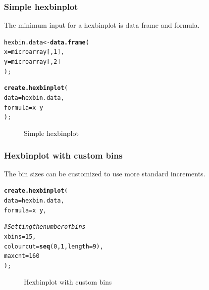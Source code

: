 \documentclass[letterpaper]{article}\usepackage[]{graphicx}\usepackage[]{color}
\makeatletter
\newcommand{\hlnum}[1]{\textcolor[rgb]{0.686,0.059,0.569}{#1}}%
\newcommand{\hlcom}[1]{\textcolor[rgb]{0.678,0.584,0.686}{\textit{#1}}}%
\newcommand{\hlopt}[1]{\textcolor[rgb]{0,0,0}{#1}}%
\newcommand{\hlstd}[1]{\textcolor[rgb]{0.345,0.345,0.345}{#1}}%
\newcommand{\hlkwb}[1]{\textcolor[rgb]{0.69,0.353,0.396}{#1}}%
\newcommand{\hlkwc}[1]{\textcolor[rgb]{0.333,0.667,0.333}{#1}}%
\newcommand{\hlkwd}[1]{\textcolor[rgb]{0.737,0.353,0.396}{\textbf{#1}}}%
\newenvironment{kframe}{%
 \def\at@end@of@kframe{}%
 \ifinner\ifhmode%
  \def\at@end@of@kframe{\end{minipage}}%
  \begin{minipage}{\columnwidth}%
 \fi\fi%
 \def\FrameCommand##1{\hskip\@totalleftmargin \hskip-\fboxsep
 \colorbox{shadecolor}{##1}\hskip-\fboxsep
     \hskip-\linewidth \hskip-\@totalleftmargin \hskip\columnwidth}%
 \MakeFramed {\advance\hsize-\width
   \@totalleftmargin\z@ \linewidth\hsize
   \@setminipage}}%
 {\par\unskip\endMakeFramed%
 \at@end@of@kframe}
\newenvironment{knitrout}{}{} %
\makeatother
\begin{document}
\subsubsection{Simple hexbinplot}
The minimum input for a hexbinplot is data frame and formula.
\begin{knitrout}
\color{fgcolor}\begin{kframe}
\begin{alltt}
\hlstd{hexbin.data} \hlkwb{<-} \hlkwd{data.frame}\hlstd{(}
    \hlkwc{x} \hlstd{= microarray[,}\hlnum{1}\hlstd{],}
    \hlkwc{y} \hlstd{= microarray[,}\hlnum{2}\hlstd{]}
    \hlstd{);}

\hlkwd{create.hexbinplot}\hlstd{(}
    \hlkwc{data} \hlstd{= hexbin.data,}
    \hlkwc{formula} \hlstd{= x} \hlopt{~} \hlstd{y}
    \hlstd{);}
\end{alltt}
\end{kframe}\begin{figure}[]


{\centering {} 

}

\caption[Simple hexbinplot]{Simple hexbinplot\label{fig:hexbin1}}
\end{figure}


\end{knitrout}

\subsubsection{Hexbinplot with custom bins}
The bin sizes can be customized to use more standard increments.
\begin{knitrout}
\color{fgcolor}\begin{kframe}
\begin{alltt}
\hlkwd{create.hexbinplot}\hlstd{(}
    \hlkwc{data} \hlstd{= hexbin.data,}
    \hlkwc{formula} \hlstd{= x} \hlopt{~} \hlstd{y,}

    \hlcom{# Setting the number of bins}
    \hlkwc{xbins} \hlstd{=} \hlnum{15}\hlstd{,}
    \hlkwc{colourcut} \hlstd{=} \hlkwd{seq}\hlstd{(}\hlnum{0}\hlstd{,} \hlnum{1}\hlstd{,} \hlkwc{length} \hlstd{=} \hlnum{9}\hlstd{),}
    \hlkwc{maxcnt} \hlstd{=} \hlnum{160}
    \hlstd{);}
\end{alltt}
\end{kframe}\begin{figure}[]


{\centering {} 

}

\caption[Hexbinplot with custom bins]{Hexbinplot with custom bins\label{fig:hexbin2}}
\end{figure}


\end{knitrout}
\end{document}
